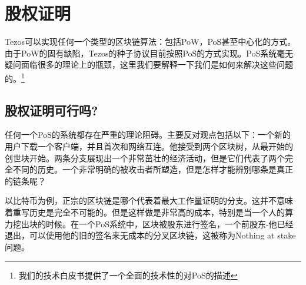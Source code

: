 \documentclass[letterpaper]{article}
\begin{document}
\section{股权证明}
Tezos可以实现任何一个类型的区块链算法：包括PoW，PoS甚至中心化的方式。
由于PoW的固有缺陷，Tezos的种子协议目前按照PoS的方式实现。PoS系统毫无
疑问面临很多的理论上的瓶颈，这里我们要解释一下我们是如何来解决这些问题
的。\footnote{我们的技术白皮书提供了一个全面的技术性的对PoS的描述}

\subsection{股权证明可行吗?}

任何一个PoS的系统都存在严重的理论阻碍。主要反对观点包括以下：一个新的
用户下载一个客户端，并且首次和网络互连。他接受到两个区块树，从最开始的
创世块开始。两条分支展现出一个非常茁壮的经济活动，但是它们代表了两个完
全不同的历史。一个非常明确的被攻击者所塑造，但是怎样才能辨别哪条是真正
的链条呢？

以比特币为例，正宗的区块链是哪个代表着最大工作量证明的分支。这并不意味
着重写历史是完全不可能的。但是这样做是非常高的成本，特别是当一个人的算
力挖出块的时候。在一个PoS系统中，区块被股东进行签名，一个前股东-他已经
退出，可以使用他的旧的签名来无成本的分叉区块链，这被称为Nothing at
stake问题。
\end{document}
